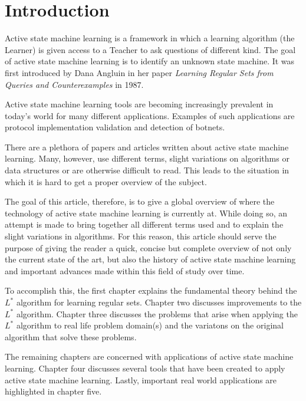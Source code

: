 \documentclass[multi,crop=false,class=article]{standalone}
\begin{document}
\section*{Introduction}
\label{sec:introduction}

Active state machine learning is a framework in which a learning algorithm (the
Learner) is given access to a Teacher to ask questions of different kind. The
goal of active state machine learning is to identify an unknown state machine.
It was first introduced by Dana Angluin in her paper \textit{Learning Regular
Sets from Queries and Counterexamples} in 1987\cite{Angluin1987}.

Active state machine learning tools are becoming increasingly prevalent in
today's world for many different applications.  Examples
of such applications are protocol implementation validation and detection of
botnets. 

There are a plethora of papers and articles written about active state machine
learning. Many, however, use different terms, slight variations on algorithms
or data structures or are otherwise difficult to read. This leads to the
situation in which it is hard to get a proper overview of the subject.

The goal of this article, therefore, is to give a global overview of where the
technology of active state machine learning is currently at. While doing so, an
attempt is made to bring together all different terms used and to explain the
slight variations in algorithms. For this reason, this article should serve the
purpose of giving the reader a quick, concise but complete overview of not only
the current state of the art, but also the history of active state machine
learning and important advances made within this field of study over time.

To accomplish this, the first chapter explains the fundamental theory behind the
$L^{*}$ algorithm for learning regular sets. Chapter two discusses improvements
to the $L^{*}$ algorithm. Chapter three discusses the problems that arise when
applying the $L^{*}$ algorithm to real life problem domain(s) and the variatons
on the original algorithm that solve these problems.

The remaining chapters are concerned with applications of active state machine
learning. Chapter four discusses several tools that have been created to apply
active state machine learning. Lastly, important real world applications are
highlighted in chapter five.
\end{document}
